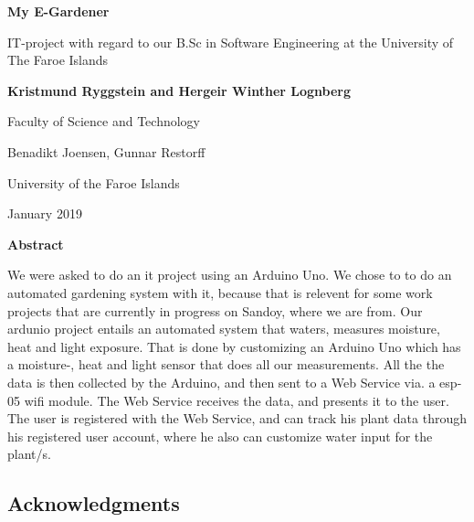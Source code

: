 \documentclass{article}
\begin{document}
\begin{titlepage}
\begin{center}
\vspace{1cm}
\huge
\textbf{My E-Gardener}

\LARGE
\vspace{.5cm}
IT-project with regard to our B.Sc in Software Engineering at the University of The Faroe Islands


\vspace{.5cm}
\textbf{Kristmund Ryggstein and Hergeir Winther Lognberg}\\
\vspace{.5cm}
\Large
\vspace{.5cm}
\vfill
\begin{center}
Faculty of Science and Technology

Benadikt Joensen, Gunnar Restorff

University of the Faroe Islands

January 2019

\pagebreak
\Large
\textbf{Abstract}

\end{center}
We were asked to do an it project using an Arduino Uno. We chose to to do an automated gardening system with it, because that is relevent for some work projects that are currently in progress on Sandoy, where we are from. Our ardunio project entails an automated system that waters, measures moisture, heat and light exposure. That is done by customizing an Arduino Uno which has a moisture-, heat and light sensor that does all our measurements. All the the data is then collected by the Arduino, and then sent to a Web Service via. a esp-05 wifi module. The Web Service receives the data, and presents it to the user. The user is registered with the Web Service, and can track his plant data through his registered user account, where he also can customize water input for the plant/s.


\end{center}
\end{titlepage}
\tableofcontents
\listoffigures
\listoftables
\pagebreak
{}
\begin{center}\section*{Acknowledgments}\end{center}
\end{document}
